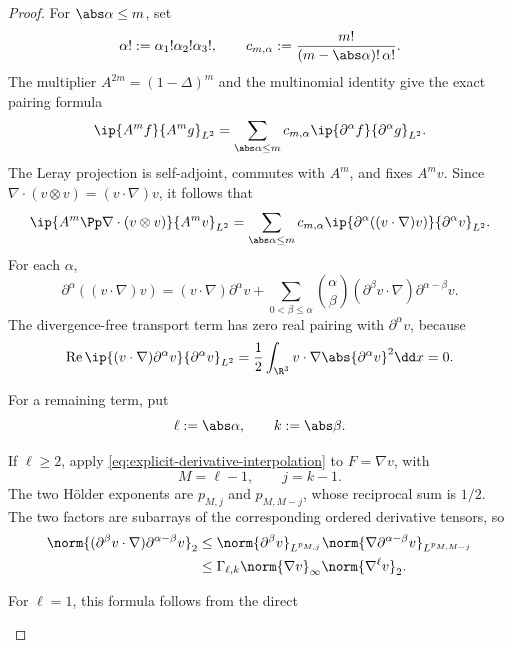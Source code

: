 \begin{proof}
For \(\abs\alpha\le m\), set
\[
 \alpha!:=\alpha_1!\alpha_2!\alpha_3!,
 \qquad
 c_{m,\alpha}:=\frac{m!}{(m-\abs\alpha)!\,\alpha!}.
\]
The multiplier \(A^{2m}=(1-\Delta)^m\) and the multinomial identity give the
exact pairing formula
\begin{equation}
 \ip{A^mf}{A^mg}_{L^2}
 =\sum_{\abs\alpha\le m}c_{m,\alpha}
   \ip{\partial^\alpha f}{\partial^\alpha g}_{L^2}.
 \label{eq:integer-Am-pairing}
\end{equation}
The Leray projection is self-adjoint, commutes with \(A^m\), and fixes
\(A^mv\).  Since
\(\nabla\cdot(v\otimes v)=(v\cdot\nabla)v\), it follows that
\begin{equation}
 \ip{A^m\Pp\nabla\cdot(v\otimes v)}{A^mv}_{L^2}
 =\sum_{\abs\alpha\le m}c_{m,\alpha}
   \ip{\partial^\alpha((v\cdot\nabla)v)}
      {\partial^\alpha v}_{L^2}.
 \label{eq:integer-projected-pairing}
\end{equation}
For each \(\alpha\),
\[
 \partial^\alpha((v\cdot\nabla)v)
 =(v\cdot\nabla)\partial^\alpha v
 +\sum_{0<\beta\le\alpha}\binom\alpha\beta
 (\partial^\beta v\cdot\nabla)
 \partial^{\alpha-\beta}v.
\]
The divergence-free transport term has zero real pairing with
\(\partial^\alpha v\), because
\[
 \operatorname{Re}\ip{(v\cdot\nabla)\partial^\alpha v}
 {\partial^\alpha v}_{L^2}
 =\frac12\int_{\R^3}v\cdot\nabla
   \abs{\partial^\alpha v}^2\dd x=0.
\]
\begin{samepage}
For a remaining term, put
\[
 \ell:=\abs\alpha,
 \qquad k:=\abs\beta.
\]
\par
\end{samepage}
\begin{samepage}
If \(\ell\ge2\), apply
\eqref{eq:explicit-derivative-interpolation} to \(F=\nabla v\), with
\[
 M=\ell-1,
 \qquad j=k-1.
\]
The two H\"older exponents are \(p_{M,j}\) and \(p_{M,M-j}\), whose
reciprocal sum is \(1/2\).  The two factors are subarrays of the corresponding
ordered derivative tensors, so
\begin{align}
 \norm{(\partial^\beta v\cdot\nabla)
          \partial^{\alpha-\beta}v}_2
 &\le
 \norm{\partial^\beta v}_{L^{p_{M,j}}}
 \norm{\nabla\partial^{\alpha-\beta}v}_{L^{p_{M,M-j}}}\notag\\
 &\le\Gamma_{\ell,k}\norm{\nabla v}_\infty
       \norm{\nabla^\ell v}_2.
 \label{eq:explicit-commutator-product}
\end{align}
\par
\end{samepage}
\begin{samepage}
For \(\ell=1\), this formula follows from the direct

\end{samepage}
\end{proof}

